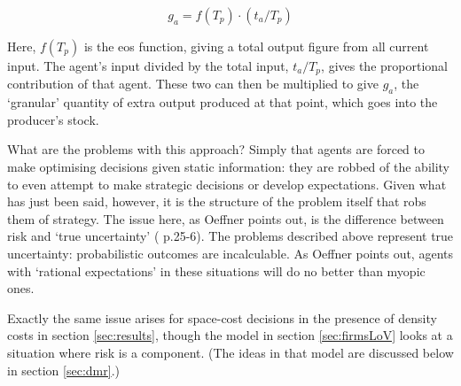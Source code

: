 {\begin{equation}
g_a = f(T_p) \cdot (t_a / T_p)
\end{equation}

Here, $f(T_p)$ is the \gls{eos} function, giving a total output figure from all current input. The agent's input divided by the total input, $t_a/T_p$, gives the proportional contribution of that agent. These two can then be multiplied to give $g_a$, the `granular' quantity of extra output produced at that point, which goes into the producer's stock.

What are the problems with this approach? Simply that agents are forced to make optimising decisions given static information: they are robbed of the ability to even attempt to make strategic decisions or develop expectations. Given what has just been said, however, it is the structure of the problem itself that robs them of strategy. The issue here, as Oeffner points out, is the difference between risk and `true uncertainty' (\citealt{oeffner_agent-based_2008} p.25-6). The problems described above represent true uncertainty: probabilistic outcomes are incalculable. As Oeffner points out, agents with `rational expectations' in these situations will do no better than myopic ones. 

Exactly the same issue arises for space-cost decisions in the presence of density costs in section \ref{sec:results}, though the model in section \ref{sec:firmsLoV} looks at a situation where risk is a component. (The ideas in that model are discussed below in section \ref{sec:dmr}.)

}
